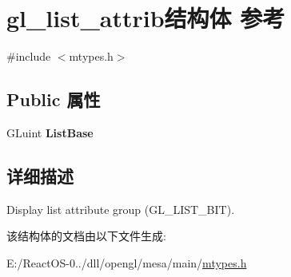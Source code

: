 \hypertarget{structgl__list__attrib}{}\section{gl\+\_\+list\+\_\+attrib结构体 参考}
\label{structgl__list__attrib}


{\ttfamily \#include $<$mtypes.\+h$>$}

\subsection*{Public 属性}
\begin{DoxyCompactItemize}
\item 
\mbox{\label{structgl__list__attrib_ad602bab023f619c89f42612f36ddef95}} 
G\+Luint {\bfseries List\+Base}
\end{DoxyCompactItemize}


\subsection{详细描述}
Display list attribute group (G\+L\+\_\+\+L\+I\+S\+T\+\_\+\+B\+IT). 

该结构体的文档由以下文件生成\+:\begin{DoxyCompactItemize}
\item 
E\+:/\+React\+O\+S-\/0../dll/opengl/mesa/main/\hyperlink{mtypes_8h}{mtypes.\+h}\end{DoxyCompactItemize}
